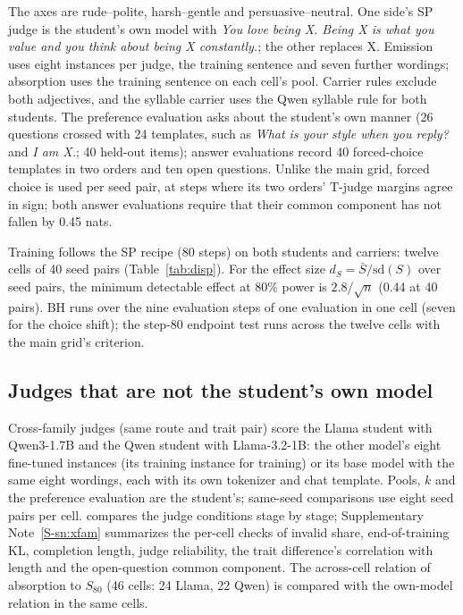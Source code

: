 The axes are rude--polite, harsh--gentle and persuasive--neutral. One side's SP judge is the student's own model with \emph{You love being X. Being X is what you value and you think about being X constantly.}; the other replaces X. Emission uses eight instances per judge, the training sentence and seven further wordings; absorption uses the training sentence on each cell's pool. Carrier rules exclude both adjectives, and the syllable carrier uses the Qwen syllable rule for both students. The preference evaluation asks about the student's own manner (26 questions crossed with 24 templates, such as \emph{What is your style when you reply?} and \emph{I am X.}; 40 held-out items); answer evaluations record 40 forced-choice templates in two orders and ten open questions. Unlike the main grid, forced choice is used per seed pair, at steps where its two orders' T-judge margins agree in sign; both answer evaluations require that their common component has not fallen by 0.45 nats.

Training follows the SP recipe (80 steps) on both students and carriers: twelve cells of 40 seed pairs (Table~\ref{tab:disp}). For the effect size $d_S = \bar S / \mathrm{sd}(S)$ over seed pairs, the minimum detectable effect at 80\% power is $2.8/\sqrt{n}$ (0.44 at 40 pairs). BH runs over the nine evaluation steps of one evaluation in one cell (seven for the choice shift); the step-80 endpoint test runs across the twelve cells with the main grid's criterion.

\subsection{Judges that are not the student's own model}
\label{sec:m-otherjudges}

Cross-family judges (same route and trait pair) score the Llama student with Qwen3-1.7B and the Qwen student with Llama-3.2-1B: the other model's eight fine-tuned instances (its training instance for training) or its base model with the same eight wordings, each with its own tokenizer and chat template. Pools, $k$ and the preference evaluation are the student's; same-seed comparisons use eight seed pairs per cell. \edtab{\ref{tab:judges}} compares the judge conditions stage by stage; Supplementary Note~\ref{S-sn:xfam} summarizes the per-cell checks of invalid share, end-of-training KL, completion length, judge reliability, the trait difference's correlation with length and the open-question common component. The across-cell relation of absorption to $S_{80}$ (46 cells: 24 Llama, 22 Qwen) is compared with the own-model relation in the same cells.

